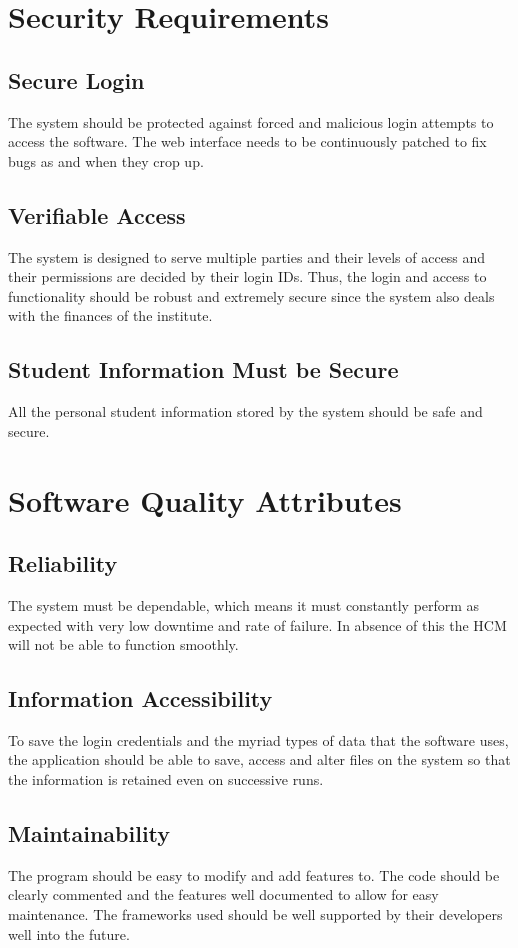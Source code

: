 \documentclass{scrreprt}
\begin{document}
\section{Security Requirements}
\subsection{Secure Login}
The system should be protected against forced and malicious login attempts to access the software. The web interface needs to be continuously patched to fix bugs as and when they crop up.
\subsection{Verifiable Access}
The system is designed to serve multiple parties and their levels of access and their permissions are decided by their login IDs. Thus, the login and access to functionality should be robust and extremely secure since the system also deals with the finances of the institute.
\subsection{Student Information Must be Secure}
All the personal student information stored by the system should be safe and secure.

\section{Software Quality Attributes}
\subsection{Reliability}
The system must be dependable, which means it must constantly perform as expected with very low downtime and rate of failure. In absence of this the HCM will not be able to function smoothly.
\subsection{Information Accessibility}
To save the login credentials and the myriad types of data that the software uses, the application should be able to save, access and alter files on the system so that the information is retained even on successive runs.
\subsection{Maintainability}
The program should be easy to modify and add features to. The code should be clearly commented and the features well documented to allow for easy maintenance. The frameworks used should be well supported by their developers well into the future.
\end{document}
